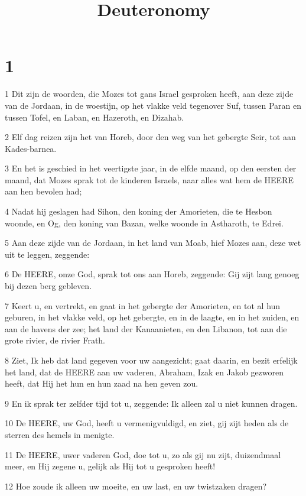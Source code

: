 

\title{Deuteronomy}



\chapter{1}

\par 1 Dit zijn de woorden, die Mozes tot gans Israel gesproken heeft, aan deze zijde van de Jordaan, in de woestijn, op het vlakke veld tegenover Suf, tussen Paran en tussen Tofel, en Laban, en Hazeroth, en Dizahab.
\par 2 Elf dag reizen zijn het van Horeb, door den weg van het gebergte Seir, tot aan Kades-barnea.
\par 3 En het is geschied in het veertigste jaar, in de elfde maand, op den eersten der maand, dat Mozes sprak tot de kinderen Israels, naar alles wat hem de HEERE aan hen bevolen had;
\par 4 Nadat hij geslagen had Sihon, den koning der Amorieten, die te Hesbon woonde, en Og, den koning van Bazan, welke woonde in Astharoth, te Edrei.
\par 5 Aan deze zijde van de Jordaan, in het land van Moab, hief Mozes aan, deze wet uit te leggen, zeggende:
\par 6 De HEERE, onze God, sprak tot ons aan Horeb, zeggende: Gij zijt lang genoeg bij dezen berg gebleven.
\par 7 Keert u, en vertrekt, en gaat in het gebergte der Amorieten, en tot al hun geburen, in het vlakke veld, op het gebergte, en in de laagte, en in het zuiden, en aan de havens der zee; het land der Kanaanieten, en den Libanon, tot aan die grote rivier, de rivier Frath.
\par 8 Ziet, Ik heb dat land gegeven voor uw aangezicht; gaat daarin, en bezit erfelijk het land, dat de HEERE aan uw vaderen, Abraham, Izak en Jakob gezworen heeft, dat Hij het hun en hun zaad na hen geven zou.
\par 9 En ik sprak ter zelfder tijd tot u, zeggende: Ik alleen zal u niet kunnen dragen.
\par 10 De HEERE, uw God, heeft u vermenigvuldigd, en ziet, gij zijt heden als de sterren des hemels in menigte.
\par 11 De HEERE, uwer vaderen God, doe tot u, zo als gij nu zijt, duizendmaal meer, en Hij zegene u, gelijk als Hij tot u gesproken heeft!
\par 12 Hoe zoude ik alleen uw moeite, en uw last, en uw twistzaken dragen?
